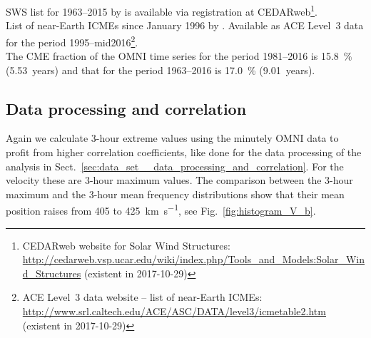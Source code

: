 SWS list for 1963--2015 by \citep{Richardson2000,Richardson2012} is available via registration at CEDARweb\footnote{CEDARweb website for Solar Wind Structures: \url{http://cedarweb.vsp.ucar.edu/wiki/index.php/Tools_and_Models:Solar_Wind_Structures} (existent in 2017-10-29)}.\\
List of near-Earth ICMEs since January 1996 by \citet{Cane2003,Richardson2010}. Available as ACE Level~3 data for the period 1995--mid2016\footnote{ACE Level~3 data website -- list of near-Earth ICMEs: \url{http://www.srl.caltech.edu/ACE/ASC/DATA/level3/icmetable2.htm} (existent in 2017-10-29)}.\\

The CME fraction of the OMNI time series for the period 1981--2016 is \SI{15.8}{\%} (5.53~years) and that for the period 1963--2016 is \SI{17.0}{\%} (9.01~years).\\



\subsection{Data processing and correlation}
Again we calculate 3-hour extreme values using the minutely OMNI data to profit from higher correlation coefficients, like done for the data processing of the \vBz{} analysis in Sect.~\ref{sec:data_set__data_processing_and_correlation}. For the velocity these are 3-hour maximum values. The comparison between the 3-hour maximum and the 3-hour mean frequency distributions show that their mean position raises from 405 to \SI{425}{\km\per\s}, see Fig.~\ref{fig:histogram_V_b}.\\
\begin{figure}
\end{figure}

